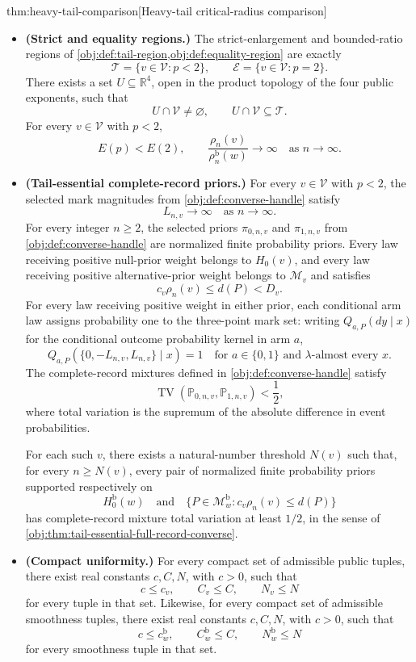 \documentclass[11pt]{article}
\begin{document}
\begin{theoremv}{thm:heavy-tail-comparison}[Heavy-tail critical-radius comparison]
\begin{itemize}
\item \textbf{(Strict and equality regions.)}
The strict-enlargement and bounded-ratio regions of \cref{obj:def:tail-region,obj:def:equality-region} are exactly
\[
\mathcal T=\{v\in\mathcal V:p<2\},
\qquad
\mathcal E=\{v\in\mathcal V:p=2\}.
\]
There exists a set \(U\subseteq\mathbb R^4\), open in the product topology of the four public exponents, such that
\[
U\cap\mathcal V\ne\varnothing,
\qquad
U\cap\mathcal V\subseteq\mathcal T.
\]
For every \(v\in\mathcal V\) with \(p<2\),
\[
E(p)<E(2),
\qquad
\frac{\rho_n(v)}{\rho_n^{\mathrm b}(w)}
\longrightarrow\infty
\quad\text{as }n\longrightarrow\infty.
\]

\item \textbf{(Tail-essential complete-record priors.)}
For every \(v\in\mathcal V\) with \(p<2\), the selected mark magnitudes from \cref{obj:def:converse-handle} satisfy
\[
L_{n,v}\longrightarrow\infty
\quad\text{as }n\longrightarrow\infty.
\]
For every integer \(n\ge2\), the selected priors
\(\pi_{0,n,v}\) and \(\pi_{1,n,v}\) from \cref{obj:def:converse-handle} are normalized finite probability priors. Every law receiving positive null-prior weight belongs to \(H_0(v)\), and every law receiving positive alternative-prior weight belongs to \(\mathcal M_v\) and satisfies
\[
c_v\rho_n(v)\le d(P)<D_v.
\]
For every law receiving positive weight in either prior, each conditional arm law assigns probability one to the three-point mark set: writing \(Q_{a,P}(dy\mid x)\) for the conditional outcome probability kernel in arm \(a\),
\[
Q_{a,P}\!\left(\{0,-L_{n,v},L_{n,v}\}\mid x\right)=1
\quad
\text{for }a\in\{0,1\}\text{ and }\lambda\text{-almost every }x.
\]
The complete-record mixtures defined in \cref{obj:def:converse-handle} satisfy
\[
\operatorname{TV}\!\left(\mathbb P_{0,n,v},\mathbb P_{1,n,v}\right)<\frac12,
\]
where total variation is the supremum of the absolute difference in event probabilities.

For each such \(v\), there exists a natural-number threshold \(N(v)\) such that, for every \(n\ge N(v)\), every pair of normalized finite probability priors supported respectively on
\[
H_0^{\mathrm b}(w)
\quad\text{and}\quad
\{P\in\mathcal M^{\mathrm b}_w:c_v\rho_n(v)\le d(P)\}
\]
has complete-record mixture total variation at least \(1/2\), in the sense of \cref{obj:thm:tail-essential-full-record-converse}.

\item \textbf{(Compact uniformity.)}
For every compact set of admissible public tuples, there exist real constants \(c,C,N\), with \(c>0\), such that
\[
c\le c_v,\qquad C_v\le C,\qquad N_v\le N
\]
for every tuple in that set. Likewise, for every compact set of admissible smoothness tuples, there exist real constants \(c,C,N\), with \(c>0\), such that
\[
c\le c_w^{\mathrm b},
\qquad
C_w^{\mathrm b}\le C,
\qquad
N_w^{\mathrm b}\le N
\]
for every smoothness tuple in that set.
\end{itemize}
\end{theoremv}
\end{document}
